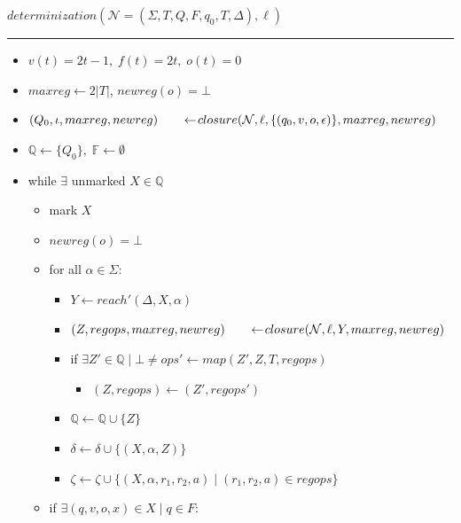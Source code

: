 \documentclass{article}
\newcommand{\Xset}{\!\leftarrow\!}
\newcommand{\Xin}{\!\in\!}
\newcommand{\Xeq}{\!=\!}
\newcommand{\XN}{\mathcal{N}}
\newcommand{\YF}{\mathbb{F}}
\newcommand{\YQ}{\mathbb{Q}}
\theoremstyle{definition}
\begin{document}
\begin{multicols}{2}
    $determinization(\XN \Xeq (\Sigma, T, Q, F, q_0, T, \Delta), \ell)$
    \hrule
    \begin{itemize}[leftmargin=0in]
        \smallskip
        \item[] $v(t) \Xeq 2t\!-\!1,
            \; f(t) \Xeq 2t,
            \; o(t) \Xeq 0$
        \item[] $maxreg \Xset 2|T|$, $newreg(o) \Xeq \bot$
        \item[] $(Q_0, \iota, maxreg, newreg) \\
            \hphantom{\hspace{2em}} \Xset closure(\XN, \ell, \{(q_0, v, o, \epsilon)\}, maxreg, newreg)$
        \item[] $\YQ \Xset \{ Q_0 \}, \; \YF \Xset \emptyset$
        \smallskip
        \item[] while $\exists$ unmarked $X \Xin \YQ$
        \begin{itemize}
            \item[] mark $X$
            \smallskip
            \item[] $newreg(o) \Xeq \bot$
            \item[] for all $\alpha \in \Sigma$:
            \begin{itemize}
                \item[] $Y \Xset reach'(\Delta, X, \alpha)$
                \item[] $(Z, regops, maxreg, newreg) \\
                    \hphantom{\hspace{2em}} \Xset closure(\XN, \ell, Y, maxreg, newreg)$
                \item[] if $\exists Z' \Xin \YQ \mid \bot\!\neq\!ops' \Xset map(Z', Z, T, regops)$
                \begin{itemize}
                    \item[] $(Z, regops) \Xset (Z', regops')$
                \end{itemize}
                \item[] $\YQ \Xset \YQ \cup \{ Z \}$
                \item[] $\delta \Xset \delta \cup \{(X, \alpha, Z)\}$
                \item[] $\zeta \Xset \zeta \cup \{(X, \alpha, r_1, r_2, a) \mid (r_1, r_2, a) \Xin regops \}$
            \end{itemize}
            \smallskip
            \item[] if $\exists (q, v, o, x) \Xin X \mid q \Xin F$:

\end{itemize}
\end{itemize}
\end{multicols}
\end{document}
